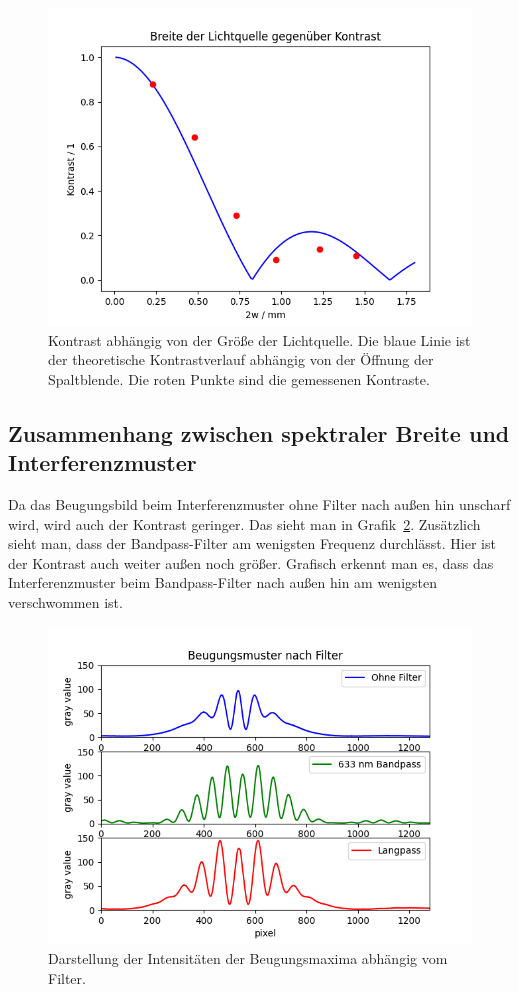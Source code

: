 \documentclass{article}
\begin{document}
\begin{figure}[H]
\centering
\caption{Kontrast abhängig von der Größe der Lichtquelle. Die blaue Linie ist der theoretische Kontrastverlauf abhängig von der Öffnung der Spaltblende. Die roten Punkte sind die gemessenen Kontraste.}
\label{fig:curve_task1}
\includegraphics[width=12cm]{curve_task1.png}
\end{figure}




\subsection{Zusammenhang zwischen spektraler Breite und Interferenzmuster}

Da das Beugungsbild beim Interferenzmuster ohne Filter nach außen hin unscharf wird, wird auch der Kontrast geringer. Das sieht man in Grafik~\ref{fig:filter_kurven}. Zusätzlich sieht man, dass der Bandpass-Filter am wenigsten Frequenz durchlässt. Hier ist der Kontrast auch weiter außen noch größer. Grafisch erkennt man es, dass das Interferenzmuster beim Bandpass-Filter nach außen hin am wenigsten verschwommen ist.

\begin{figure}[H]
\centering
\caption{Darstellung der Intensitäten der Beugungsmaxima abhängig vom Filter.}
\label{fig:filter_kurven}
\includegraphics[width=12cm]{filter.png}
\end{figure}
\end{document}
